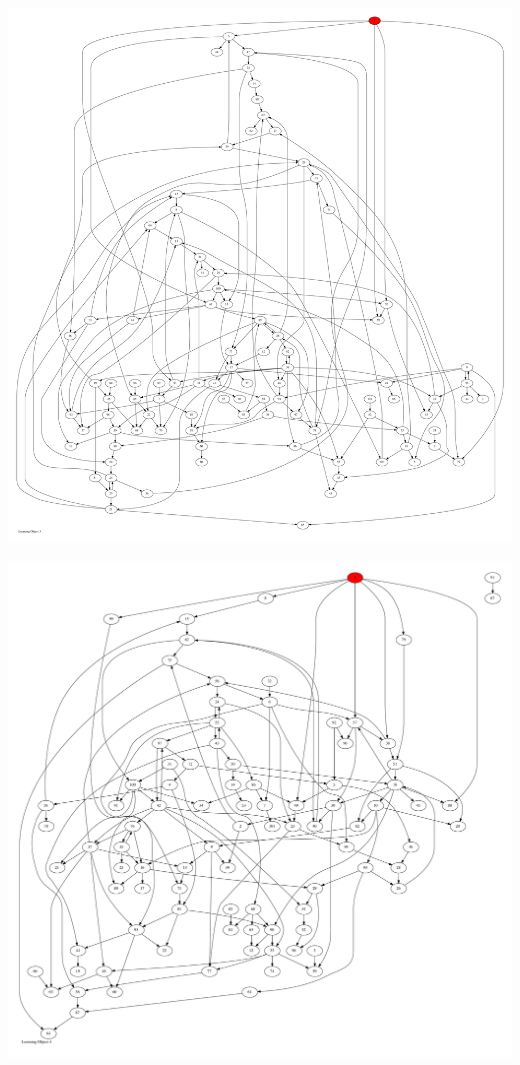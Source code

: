 \documentclass{article}
\begin{document}
\newpage
\includegraphics[max height=\textheight,max width=\textwidth]{looming_object/loom_obj3_pp.pdf}

\newpage
\includegraphics[max height=\textheight,max width=\textwidth]{looming_object/loom_obj4_pp.pdf}
\end{document}
